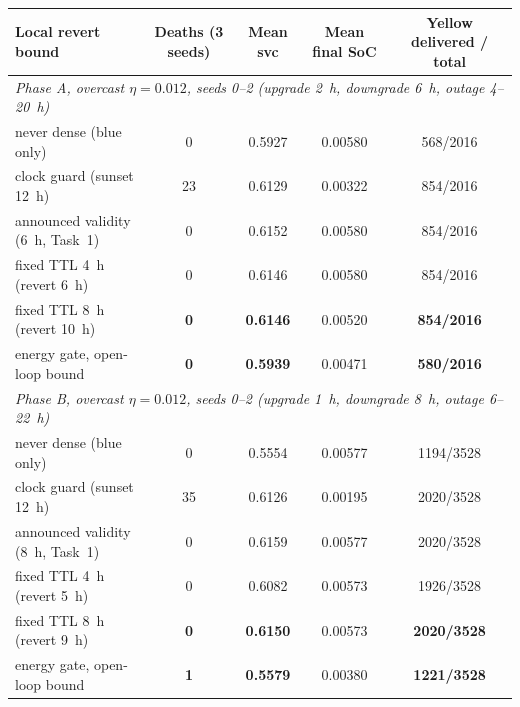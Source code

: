 \begin{tabular}{lcccc}
\toprule
Local revert bound & Deaths (3 seeds) & Mean svc & Mean final SoC & Yellow delivered / total\\
\midrule
\multicolumn{5}{l}{\emph{Phase A, overcast $\eta{=}0.012$, seeds 0--2 (upgrade 2~h, downgrade 6~h, outage 4--20~h)}}\\
never dense (blue only) & 0 & 0.5927 & 0.00580 & 568/2016\\
clock guard (sunset 12~h) & 23 & 0.6129 & 0.00322 & 854/2016\\
announced validity (6~h, Task~1) & 0 & 0.6152 & 0.00580 & 854/2016\\
fixed TTL 4~h (revert 6~h) & 0 & 0.6146 & 0.00580 & 854/2016\\
fixed TTL 8~h (revert 10~h) & \textbf{0} & \textbf{0.6146} & 0.00520 & \textbf{854/2016}\\
energy gate, open-loop bound & \textbf{0} & \textbf{0.5939} & 0.00471 & \textbf{580/2016}\\
\midrule
\multicolumn{5}{l}{\emph{Phase B, overcast $\eta{=}0.012$, seeds 0--2 (upgrade 1~h, downgrade 8~h, outage 6--22~h)}}\\
never dense (blue only) & 0 & 0.5554 & 0.00577 & 1194/3528\\
clock guard (sunset 12~h) & 35 & 0.6126 & 0.00195 & 2020/3528\\
announced validity (8~h, Task~1) & 0 & 0.6159 & 0.00577 & 2020/3528\\
fixed TTL 4~h (revert 5~h) & 0 & 0.6082 & 0.00573 & 1926/3528\\
fixed TTL 8~h (revert 9~h) & \textbf{0} & \textbf{0.6150} & 0.00573 & \textbf{2020/3528}\\
energy gate, open-loop bound & \textbf{1} & \textbf{0.5579} & 0.00380 & \textbf{1221/3528}\\
\bottomrule
\end{tabular}
